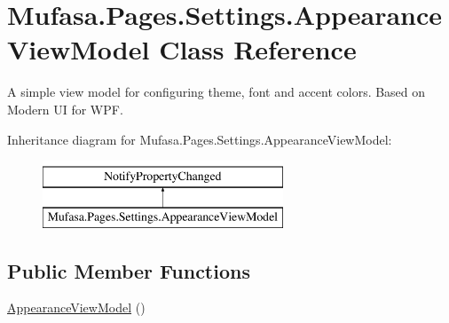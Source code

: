 \hypertarget{class_mufasa_1_1_pages_1_1_settings_1_1_appearance_view_model}{\section{Mufasa.\+Pages.\+Settings.\+Appearance\+View\+Model Class Reference}
\label{class_mufasa_1_1_pages_1_1_settings_1_1_appearance_view_model}
}


A simple view model for configuring theme, font and accent colors. Based on Modern U\+I for W\+P\+F.  


Inheritance diagram for Mufasa.\+Pages.\+Settings.\+Appearance\+View\+Model\+:\begin{figure}[H]
\begin{center}
\leavevmode
\includegraphics[height=2.000000cm]{class_mufasa_1_1_pages_1_1_settings_1_1_appearance_view_model}
\end{center}
\end{figure}
\subsection*{Public Member Functions}
\begin{DoxyCompactItemize}
\item 
\hyperlink{class_mufasa_1_1_pages_1_1_settings_1_1_appearance_view_model_a443349709ef985c2a5f0dfa5e8bb7f31}{Appearance\+View\+Model} ()
\end{DoxyCompactItemize}
